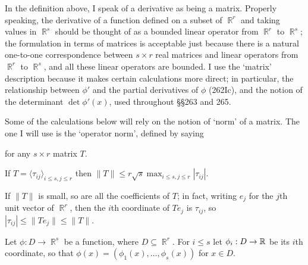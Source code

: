 { In the definition above, I speak of a derivative
as being a
matrix.   Properly speaking,  the derivative of a function defined on a
subset of $\BbbR^r$ and taking values in $\BbbR^s$ should be thought
of as a bounded linear operator from $\BbbR^r$ to $\BbbR^s$;   the
formulation in terms of matrices is acceptable just because there is a
natural one-to-one correspondence between $s\times r$ real matrices and
linear operators from $\BbbR^r$ to $\BbbR^s$, and all these linear
operators are
bounded.   I use the `matrix' description because it makes certain
calculations more direct;  in particular, the relationship between
$\phi'$ and the partial derivatives of $\phi$ (262Ic), and the notion of
the determinant $\det\phi'(x)$, used throughout \S\S263 and 265.
}%

 Some of the calculations below will
rely on the notion of `norm' of a matrix.   The one I
will use
is the `operator norm', defined by saying


\noindent for any $s\times r$ matrix $T$.   

 If $T=\langle\tau_{ij}\rangle_{i\le s,j\le r}$ then
 $\|T\|\le r\sqrt{s}\max_{i\le s,j\le r}|\tau_{ij}|$.

{ If $\|T\|$ is small, so are all the coefficients of $T$;  in fact,
writing $e_j$ for the $j$th unit vector of $\BbbR^r$, then the $i$th
coordinate of $Te_j$ is $\tau_{ij}$, so
$|\tau_{ij}|\le\|Te_j\|\le\|T\|$.}

 Let $\phi:D\to\BbbR^s$ be a function, where
$D\subseteq\BbbR^r$.   For $i\le s$ let $\phi_i:D\to\Bbb R$ be its $i$th
coordinate, so that $\phi(x)=(\phi_1(x),\ldots,\phi_s(x))$ for $x\in D$.

